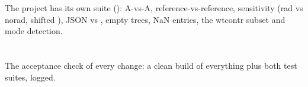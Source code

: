 The  project has its own suite (): A-vs-A, reference-vs-reference,\allowbreak{} sensitivity (rad vs norad, shifted ), JSON vs ,
empty trees, NaN entries, the wtcontr subset and mode detection.

\section{\texorpdfstring{}{tools/\allowbreak{}check\_\allowbreak{}all.\allowbreak{}sh}}\label{developer_manual-02u5fbuild:26-toolschecku5fallsh}
The acceptance check of every change: a clean build of everything plus both test suites, logged.

